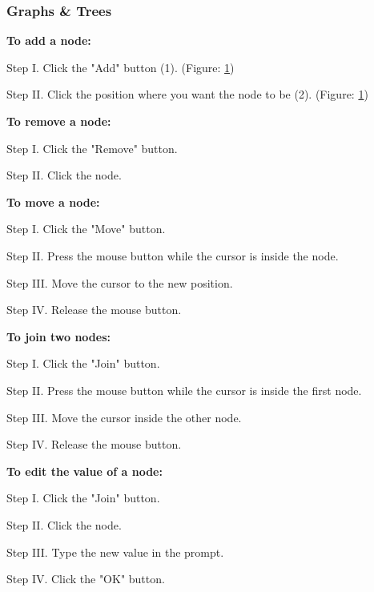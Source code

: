 \subsubsection{Graphs \& Trees}

\textbf{To add a node:}
\begin{figure}[H]
    \centering
    \setlength{\fboxsep}{0pt}
    \setlength{\fboxrule}{1pt}
    \caption{}
    \label{fig:addNode}	
\end{figure}
\begin{userManualItemlist}
    \item[Step I.] Click the "Add" button (1). (Figure: \ref{fig:addNode})
    \item[Step II.] Click the position where you want the node to be (2). (Figure: \ref{fig:addNode}) 
\end{userManualItemlist}

\textbf{To remove a node:}
\begin{userManualItemlist}
    \item[Step I.] Click the "Remove" button.
    \item[Step II.] Click the node.
\end{userManualItemlist}

\textbf{To move a node:}
\begin{userManualItemlist}
    \item[Step I.] Click the "Move" button.
    \item[Step II.] Press the mouse button while the cursor is inside the node.
    \item[Step III.] Move the cursor to the new position.
    \item[Step IV.] Release the mouse button.
\end{userManualItemlist}

\textbf{To join two nodes:}
\begin{userManualItemlist}
    \item[Step I.] Click the "Join" button.
    \item[Step II.] Press the mouse button while the cursor is inside the first node.
    \item[Step III.] Move the cursor inside the other node.
    \item[Step IV.] Release the mouse button. 
\end{userManualItemlist}

\textbf{To edit the value of a node:}
\begin{userManualItemlist}
    \item[Step I.] Click the "Join" button.
    \item[Step II.] Click the node.
    \item[Step III.] Type the new value in the prompt.
    \item[Step IV.] Click the "OK" button. 
\end{userManualItemlist}